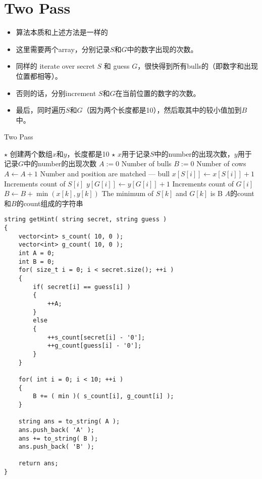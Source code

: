 \section{Two Pass}
\begin{itemize}
\item 算法本质和上述方法是一样的
\item 这里需要两个array，分别记录$S$和$G$中的数字出现的次数。
\item 同样的 iterate over secret $S$ 和 guess $G$，很快得到所有bulls的（即数字和出现位置都相等）。
\item 否则的话，分别increment $S$和$G$在当前位置的数字的次数。
\item 最后，同时遍历$S$和$G$（因为两个长度都是10），然后取其中的较小值加到$B$中。
\end{itemize}
\begin{algorithm}[H]
\caption{Two Pass}
\begin{algorithmic}[1]
\State $\star$ 创建两个数组$x$和$y$，长度都是10
\State $\star$ $x$用于记录$S$中的number的出现次数，$y$用于记录$G$中的number的出现次数
\State $A:=0$ \Comment Number of bulls
\State $B:=0$ \Comment Number of cows
\State $A\gets A+1$ \Comment Number and position are matched --- bull
\Else
\State $x[S[i]]\gets x[S[i]] +1$ \Comment Increments count of $S[i]$
\State $y[G[i]]\gets y[G[i]] +1$ \Comment Increments count of $G[i]$
\EndIf
\EndFor
{}
\State $B\gets B+\min(x[k], y[k])$ \Comment The minimum of $S[k]$ and $G[k]$ is B
\EndFor
\State \Return $A$的count和$B$的count组成的字符串
\EndProcedure
\end{algorithmic}
\end{algorithm}
\begin{lstlisting}[style=customc, caption={Two Pass}]
string getHint( string secret, string guess )
{
    vector<int> s_count( 10, 0 );
    vector<int> g_count( 10, 0 );
    int A = 0;
    int B = 0;
    for( size_t i = 0; i < secret.size(); ++i )
    {
        if( secret[i] == guess[i] )
        {
            ++A;
        }
        else
        {
            ++s_count[secret[i] - '0'];
            ++g_count[guess[i] - '0'];
        }
    }

    for( int i = 0; i < 10; ++i )
    {
        B += ( min )( s_count[i], g_count[i] );
    }

    string ans = to_string( A );
    ans.push_back( 'A' );
    ans += to_string( B );
    ans.push_back( 'B' );

    return ans;
}
\end{lstlisting}
